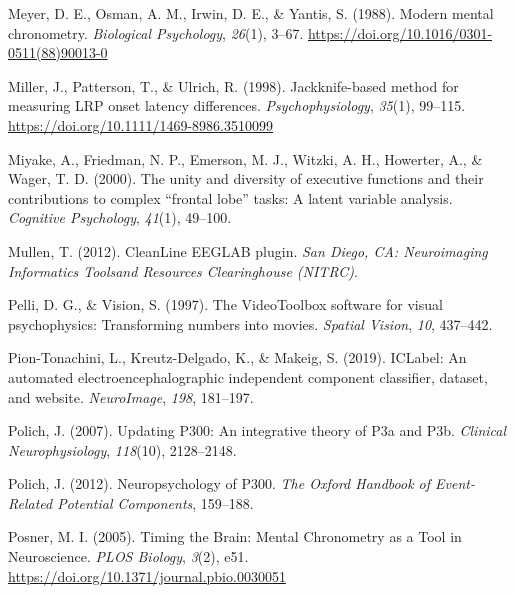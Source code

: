 \documentclass[
  man]{apa7}
\newlength{\cslhangindent}
\newlength{\cslentryspacingunit} %
\newenvironment{CSLReferences}[2] %
 {%
  \setlength{\parindent}{0pt}
  \ifodd #1
  \let\oldpar\par
  \def\par{\hangindent=\cslhangindent\oldpar}
  \fi
  \setlength{\parskip}{#2\cslentryspacingunit}
 }%
 {}
\begin{document}
\begin{CSLReferences}{1}{0}
\leavevmode{}%
Meyer, D. E., Osman, A. M., Irwin, D. E., \& Yantis, S. (1988). Modern mental chronometry. \emph{Biological Psychology}, \emph{26}(1), 3--67. \url{https://doi.org/10.1016/0301-0511(88)90013-0}

\leavevmode{}%
Miller, J., Patterson, T., \& Ulrich, R. (1998). Jackknife-based method for measuring {LRP} onset latency differences. \emph{Psychophysiology}, \emph{35}(1), 99--115. \url{https://doi.org/10.1111/1469-8986.3510099}

\leavevmode{}%
Miyake, A., Friedman, N. P., Emerson, M. J., Witzki, A. H., Howerter, A., \& Wager, T. D. (2000). The unity and diversity of executive functions and their contributions to complex {``frontal lobe''} tasks: {A} latent variable analysis. \emph{Cognitive Psychology}, \emph{41}(1), 49--100.

\leavevmode{}%
Mullen, T. (2012). {CleanLine} {EEGLAB} plugin. \emph{San Diego, CA: Neuroimaging Informatics Toolsand Resources Clearinghouse (NITRC)}.

\leavevmode{}%
Pelli, D. G., \& Vision, S. (1997). The {VideoToolbox} software for visual psychophysics: {Transforming} numbers into movies. \emph{Spatial Vision}, \emph{10}, 437--442.

\leavevmode{}%
Pion-Tonachini, L., Kreutz-Delgado, K., \& Makeig, S. (2019). {ICLabel}: {An} automated electroencephalographic independent component classifier, dataset, and website. \emph{NeuroImage}, \emph{198}, 181--197.

\leavevmode{}%
Polich, J. (2007). Updating {P300}: An integrative theory of {P3a} and {P3b}. \emph{Clinical Neurophysiology}, \emph{118}(10), 2128--2148.

\leavevmode{}%
Polich, J. (2012). Neuropsychology of {P300}. \emph{The Oxford Handbook of Event-Related Potential Components}, 159--188.

\leavevmode{}%
Posner, M. I. (2005). Timing the {Brain}: {Mental} {Chronometry} as a {Tool} in {Neuroscience}. \emph{PLOS Biology}, \emph{3}(2), e51. \url{https://doi.org/10.1371/journal.pbio.0030051}


\end{CSLReferences}
\end{document}
